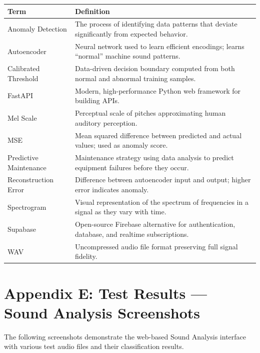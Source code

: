 \documentclass[10pt, a4paper, oneside]{report}
\begin{document}
\begin{table}[H]
\centering
\begin{tabularx}{\textwidth}{l X}
  \toprule
  \textbf{Term} & \textbf{Definition} \\
  \midrule
  Anomaly Detection      & The process of identifying data patterns that deviate significantly from expected behavior. \\
  Autoencoder            & Neural network used to learn efficient encodings; learns ``normal'' machine sound patterns. \\
  Calibrated Threshold   & Data-driven decision boundary computed from both normal and abnormal training samples. \\
  FastAPI                & Modern, high-performance Python web framework for building APIs. \\
  Mel Scale              & Perceptual scale of pitches approximating human auditory perception. \\
  MSE                    & Mean squared difference between predicted and actual values; used as anomaly score. \\
  Predictive Maintenance & Maintenance strategy using data analysis to predict equipment failures before they occur. \\
  Reconstruction Error   & Difference between autoencoder input and output; higher error indicates anomaly. \\
  Spectrogram            & Visual representation of the spectrum of frequencies in a signal as they vary with time. \\
  Supabase               & Open-source Firebase alternative for authentication, database, and realtime subscriptions. \\
  WAV                    & Uncompressed audio file format preserving full signal fidelity. \\
  \bottomrule
\end{tabularx}
\end{table}

\section*{Appendix E: Test Results --- Sound Analysis Screenshots}
\label{sec:appendix-e}

The following screenshots demonstrate the web-based Sound Analysis interface with various test audio files and their classification results.
\end{document}
